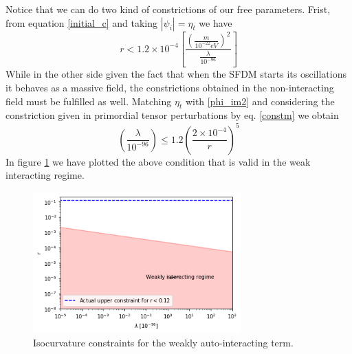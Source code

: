 \documentclass[twocolumn,           %
               showpacs,            %
               preprintnumbers,     %
               aps,                 %
               prl,          	    %
               letterpaper,             %
               superscriptaddress,      %
               nofootinbib,         %
               tightenlines,        %
               floats,floatfix      %
               ,usenatbib,
               ]{revtex4-1}
\begin{document}
Notice that we can do two kind of constrictions of our free parameters. Frist, from equation \eqref{initial_c} and taking $|\psi_i|=\eta_t$ we have
\begin{equation}
r<1.2\times 10^{-4}\left[\frac{\left(\frac{m}{10^{-22}eV}\right)^2}{\frac{\lambda}{10^{-96}}}\right]
\end{equation}
While in the other side given the fact that when the SFDM starts its oscillations it behaves as a massive field, the constrictions obtained in the non-interacting field must be fulfilled as well. Matching $\eta_t$ with \eqref{phi_im2} and considering the constriction given in primordial tensor perturbations by eq. \eqref{constm} we obtain
\begin{equation}
\left(\frac{\lambda}{10^{-96}}\right)\leq 1.2\left(\frac{2\times 10^{-4}}{r}\right)^5
\end{equation}
In figure \ref{constraintsSFDMl} we have plotted the above condition that is valid in the weak interacting regime.

\begin{figure}[h]
\includegraphics[width=8cm]{lambdavsr.png}
\caption{Isocurvature constraints for the weakly auto-interacting term.}\label{constraintsSFDMl}
\end{figure} 
\end{document}
